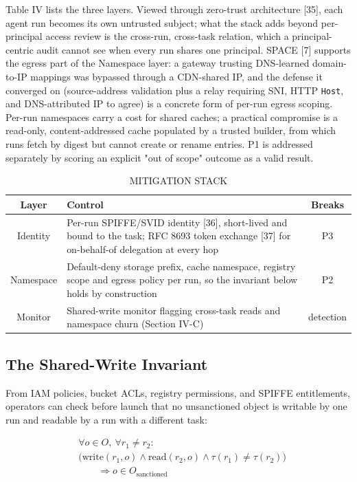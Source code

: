 \documentclass[conference]{IEEEtran}
\begin{document}
Table IV lists the three layers. Viewed through zero-trust architecture [35], each agent run becomes its own untrusted subject; what the stack adds beyond per-principal access review is the cross-run, cross-task relation, which a principal-centric audit cannot see when every run shares one principal. SPACE [7] supports the egress part of the Namespace layer: a gateway trusting DNS-learned domain-to-IP mappings was bypassed through a CDN-shared IP, and the defense it converged on (source-address validation plus a relay requiring SNI, HTTP \texttt{Host}, and DNS-attributed IP to agree) is a concrete form of per-run egress scoping. Per-run namespaces carry a cost for shared caches; a practical compromise is a read-only, content-addressed cache populated by a trusted builder, from which runs fetch by digest but cannot create or rename entries. P1 is addressed separately by scoring an explicit "out of scope" outcome as a valid result.

\begin{table}[!t]
\centering
\caption{MITIGATION STACK}
\renewcommand{\arraystretch}{1.15}
\footnotesize
\begin{tabularx}{\columnwidth}{|c|>{\raggedright\arraybackslash}X|c|}
\hline
Layer & Control & Breaks \\
\hline
Identity & Per-run SPIFFE/\allowbreak SVID identity [36], short-lived and bound to the task; RFC 8693 token exchange [37] for on-behalf-of delegation at every hop & P3 \\
Namespace & Default-deny storage prefix, cache namespace, registry scope and egress policy per run, so the invariant below holds by construction & P2 \\
Monitor & Shared-write monitor flagging cross-task reads and namespace churn (Section IV-C) & detection \\
\hline
\end{tabularx}
\end{table}

\subsection{The Shared-Write Invariant}

From IAM policies, bucket ACLs, registry permissions, and SPIFFE entitlements, operators can check before launch that no unsanctioned object is writable by one run and readable by a run with a different task:

\begin{equation}
\begin{split}
&\forall o \in O,\ \forall r_1 \neq r_2:\\
&\big(\mathrm{write}(r_1,o) \land \mathrm{read}(r_2,o) \land \tau(r_1) \neq \tau(r_2)\big)\\
&\qquad \Rightarrow o \in O_{\text{sanctioned}}
\end{split}
\label{eq:inv}
\end{equation}
\end{document}
